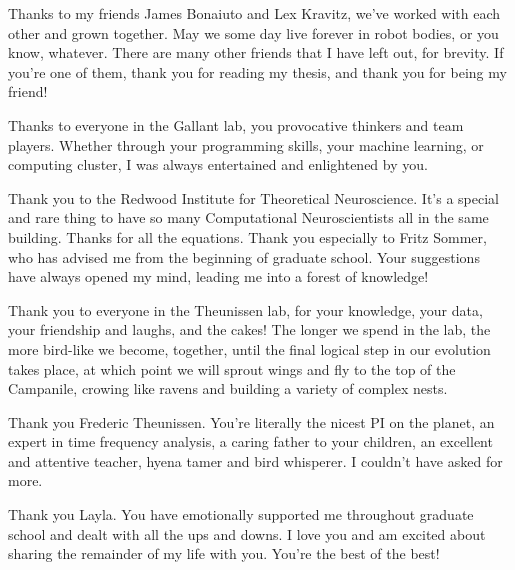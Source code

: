 \documentclass{ucbthesis}
\begin{document}
\begin{frontmatter}
\begin{acknowledgements}
Thanks to my friends James Bonaiuto and Lex Kravitz, we've worked with each other and grown together. May we some day live forever in robot bodies, or you know, whatever. There are many other friends that I have left out, for brevity. If you're one of them, thank you for reading my thesis, and thank you for being my friend!

Thanks to everyone in the Gallant lab, you provocative thinkers and team players. Whether through your programming skills, your machine learning, or computing cluster, I was always entertained and enlightened by you.

Thank you to the Redwood Institute for Theoretical Neuroscience. It's a special and rare thing to have so many Computational Neuroscientists all in the same building. Thanks for all the equations. Thank you especially to Fritz Sommer, who has advised me from the beginning of graduate school. Your suggestions have always opened my mind, leading me into a forest of knowledge!

Thank you to everyone in the Theunissen lab, for your knowledge, your data, your friendship and laughs, and the cakes! The longer we spend in the lab, the more bird-like we become, together, until the final logical step in our evolution takes place, at which point we will sprout wings and fly to the top of the Campanile, crowing like ravens and building a variety of complex nests.

Thank you Frederic Theunissen. You're literally the nicest PI on the planet, an expert in time frequency analysis, a caring father to your children, an excellent and attentive teacher, hyena tamer and bird whisperer. I couldn't have asked for more.

Thank you Layla. You have emotionally supported me throughout graduate school and dealt with all the ups and downs. I love you and am excited about sharing the remainder of my life with you. You're the best of the best!

\end{acknowledgements}


\tableofcontents
\clearpage
\listoffigures
\clearpage
\listoftables

\end{frontmatter}

\pagestyle{headings}






\printbibliography
\end{document}
